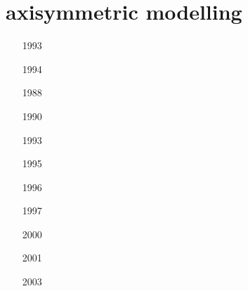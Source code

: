 

\section{axisymmetric modelling}


\begin{small}
\begin{itemize}
\item[1993]
\item[1994]
 \\
\item[1988]
\item[1990]
\item[1993]
\item[1995]
\item[1996]
\item[1997]
\item[2000]
\item[2001]
\item[2003] 
 \\
\item[]
 \\
\end{itemize}
\end{small}





